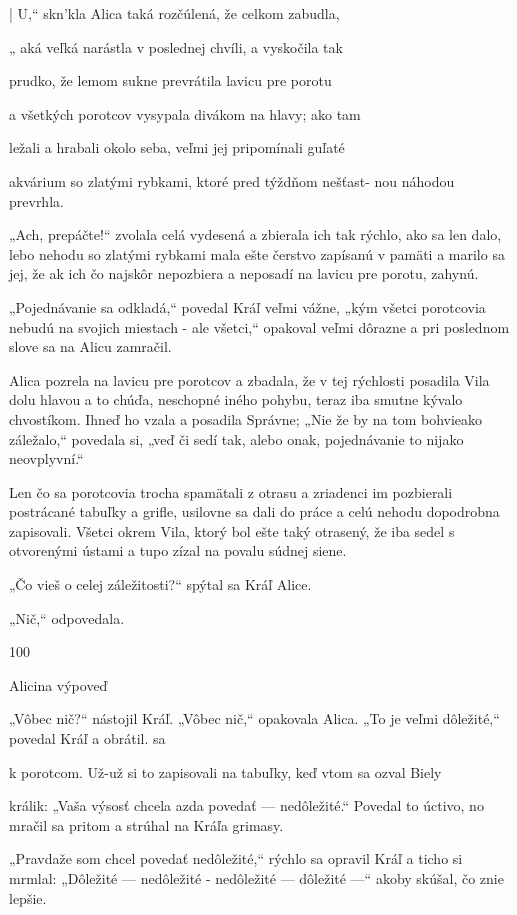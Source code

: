 \documentclass[12pt]{article}
\begin{document}
\begin{Parallel}[p]{}{}
{{| U,“ skn'kla Alica taká rozčúlená, že celkom zabudla,

„ aká veľká narástla v poslednej chvíli, a vyskočila tak

prudko, že lemom sukne prevrátila lavicu pre porotu

a všetkých porotcov vysypala divákom na hlavy; ako tam

ležali a hrabali okolo seba, veľmi jej pripomínali guľaté

akvárium so zlatými rybkami, ktoré pred týždňom nešťast-
nou náhodou prevrhla.

„Ach, prepáčte!“ zvolala celá vydesená a zbierala ich tak
rýchlo, ako sa len dalo, lebo nehodu so zlatými rybkami mala
ešte čerstvo zapísanú v pamäti a marilo sa jej, že ak ich čo
najskôr nepozbiera a neposadí na lavicu pre porotu,
zahynú.

„Pojednávanie sa odkladá,“ povedal Kráľ veľmi vážne,
„kým všetci porotcovia nebudú na svojich miestach - ale
všetci,“ opakoval veľmi dôrazne a pri poslednom slove sa
na Alicu zamračil.

Alica pozrela na lavicu pre porotcov a zbadala, že v tej
rýchlosti posadila Vila dolu hlavou a to chúďa, neschopné
iného pohybu, teraz iba smutne kývalo chvostíkom. Ihneď
ho vzala a posadila Správne; „Nie že by na tom bohvieako
záležalo,“ povedala si, „veď či sedí tak, alebo onak,
pojednávanie to nijako neovplyvní.“

Len čo sa porotcovia trocha spamätali z otrasu a zriadenci
im pozbierali postrácané tabuľky a grifle, usilovne sa dali do
práce a celú nehodu dopodrobna zapisovali. Všetci okrem
Vila, ktorý bol ešte taký otrasený, že iba sedel s otvorenými
ústami a tupo zízal na povalu súdnej siene.

„Čo vieš o celej záležitosti?“ spýtal sa Kráľ Alice.

„Nič,“ odpovedala.

100

Alicina výpoveď

„Vôbec nič?“ nástojil Kráľ.
„Vôbec nič,“ opakovala Alica.
„To je veľmi dôležité,“ povedal Kráľ a obrátil. sa

k porotcom.
Už-už si to zapisovali na tabuľky, keď vtom sa ozval Biely

králik: „Vaša výsosť chcela azda povedať — nedôležité.“
Povedal to úctivo, no mračil sa pritom a strúhal na Kráľa
grimasy.

„Pravdaže som chcel povedať nedôležité,“ rýchlo sa
opravil Kráľ a ticho si mrmlal: „Dôležité — nedôležité
- nedôležité — dôležité —“ akoby skúšal, čo znie lepšie.

}}
\end{Parallel}
\end{document}
